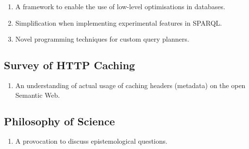 \begin{enumerate}
\item A framework to enable the use of low-level optimisations in
  databases.
\item Simplification when implementing experimental features in
  SPARQL.
\item Novel programming techniques for custom query planners.
\end{enumerate}

\subsection{Survey of HTTP Caching}

\begin{enumerate}
\item An understanding of actual usage of caching headers (metadata)
  on the open Semantic Web.
\end{enumerate}

\subsection{Philosophy of Science}

\begin{enumerate}
\item A provocation to discuss epistemological questions.
\end{enumerate}
